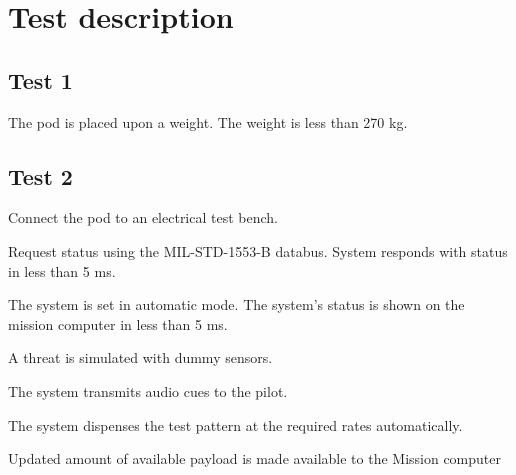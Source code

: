 \documentclass[Main]{subfiles}
\begin{document}
\chapter{Test description}

\section{Test 1}


\begin{TestCaseIntro}
\end{TestCaseIntro}

\begin{TestCase}
\TC
{The pod is placed upon a weight.}
{The weight is less than 270 kg.}

\end{TestCase}


\newpage
\section{Test 2}

\begin{TestCaseIntro}
\end{TestCaseIntro}

\begin{TestCase}
\TC
{Connect the pod to an electrical test bench.}
{}

\TC
{Request status using the MIL-STD-1553-B databus.}
{System responds with status in less than 5 ms.}


\TC
{The system is set in automatic mode.}
{The system's status is shown on the mission computer in less than 5 ms.}

\TC
{A threat is simulated with dummy sensors.}
{The system transmits audio cues to the pilot.

The system dispenses the test pattern at the required rates automatically.

Updated amount of available payload is made available to the Mission computer}


\end{TestCase}
\end{document}
